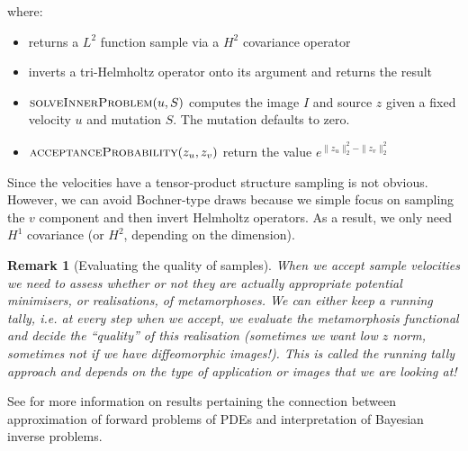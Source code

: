 \documentclass{article}
\newtheorem{remark}{Remark}
\newcommand{\norm}[2]{\| #1 \|_{ #2 }}
\newcommand{\ltwonorm}[1]{\norm{ #1 }{2}}
\begin{document}
where:
\begin{itemize}
\item \mhsample returns a $L^2$ function sample via a $H^2$ covariance operator
\item \inverthh inverts a tri-Helmholtz operator onto its argument and returns
the result
\item $\textsc{solveInnerProblem}(u,S)$ computes the image $I$ and source $z$
given a fixed velocity $u$ and mutation $S$. The mutation defaults to zero.
\item $\textsc{acceptanceProbability}(z_u, z_v)$ return the value $e^{\ltwonorm{z_u}^2
-\ltwonorm{z_v}^2}$
\end{itemize}

Since the velocities have a tensor-product structure sampling is not obvious.
However, we can avoid Bochner-type draws because we simple focus on sampling the
$v$ component and then invert Helmholtz operators. As a result, we only need
$H^1$ covariance (or $H^2$, depending on the dimension).

\begin{remark}[Evaluating the quality of samples]
When we accept sample velocities we need to
assess whether or not they are actually appropriate potential minimisers, or
realisations, of metamorphoses. We can either keep a running tally, i.e. at
every step when we accept, we evaluate the metamorphosis functional and decide
the ``quality'' of this realisation (sometimes we want low $z$ norm, sometimes
not if we have diffeomorphic images!). This is called the running tally
approach and depends on the type of application or images that we are looking
at!
\end{remark}

See \cite{cotter2010approximation} for more information on results pertaining
the connection between approximation of forward problems of PDEs and
interpretation of Bayesian inverse problems.



\end{document}
